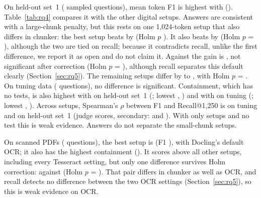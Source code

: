On held-out set~1 (\AQHeldOutQuestions{} sampled questions), mean token F1 is
highest with \RQfourBest{} (\RQfourBestFOne{}). Table~\ref{tab:rq4} compares
it with the other \RQfourComparisons{} digital setups. Answers are consistent with a large-chunk penalty, but this rests on one
1,024-token setup that also differs in chunker: the best setup beats
\RQfourDoclingFixedTokenSizeOneZeroTwoFourSetup{} by
\RQfourDoclingFixedTokenSizeOneZeroTwoFourDiff{}
\RQfourDoclingFixedTokenSizeOneZeroTwoFourCI{} (Holm $p$
\RQfourDoclingFixedTokenSizeOneZeroTwoFourHolm{}). It also beats
\RQfourDoclingMethodOneTreeTThreeEightFourSetup{} by
\RQfourDoclingMethodOneTreeTThreeEightFourDiff{}
\RQfourDoclingMethodOneTreeTThreeEightFourCI{} (Holm $p$ =
\RQfourDoclingMethodOneTreeTThreeEightFourHolm{}), although the two are tied on recall; because it contradicts recall, unlike the
first difference, we report it as open and do not claim it. Against
\RQfourDoclingLangchainDefaultSetup{} the gain is
\RQfourDoclingLangchainDefaultDiff{} \RQfourDoclingLangchainDefaultCI{}, not
significant after correction (Holm $p$ =
\RQfourDoclingLangchainDefaultHolm{}), although recall separates this default
clearly (Section~\ref{sec:rq5}). The remaining setups differ by
\RQfourDoclingLangchainRecursiveSizeFiveOneTwoDiff{} to
\RQfourDoclingLangchainRecursiveSizeTwoFiveSixDiff{}, with Holm $p$ =
\RQfourDoclingLangchainRecursiveSizeFiveOneTwoHolm{}. On tuning data (\AQTuningQuestions{} questions), no difference is
significant. Containment, which has no tests, is also highest with
\RQfourContainedHeldOutBest{} on held-out set~1
(\RQfourContainedHeldOutBestValue{}; lowest \RQfourContainedHeldOutLowest{},
\RQfourContainedHeldOutLowestValue{}) and with \RQfourContainedTuningBest{} on
tuning (\RQfourContainedTuningBestValue{}; lowest
\RQfourContainedTuningLowest{}, \RQfourContainedTuningLowestValue{}).
Across setups, Spearman's $\rho$ between F1 and
Recall@1,250 is \RQfourSpearmanTuningFOne{} on tuning and
\RQfourSpearmanHeldOutFOne{} on held-out set~1 (judge scores, secondary:
\RQfourSpearmanTuningJudge{} and \RQfourSpearmanHeldOutJudge{}). With only \RQfourSetups{} setups and no test this is weak evidence. Answers do
not separate the small-chunk setups.

On scanned PDFs (\AQScannedQuestions{} questions), the best setup is
\RQfourScannedBest{} (F1 \RQfourScannedBestFOne{}), with Docling's default OCR; it also has the highest containment
(\RQfourContainedScannedBestValue{}). It scores above all \RQfourScannedComparisons{} other setups, including every
Tesseract setting, but only one difference survives Holm correction:
\RQfourScannedTopDiff{} \RQfourScannedTopCI{} against
\RQfourScannedTopSetup{} (Holm $p$ = \RQfourScannedTopHolm{}). That pair differs
in chunker as well as OCR, and recall detects no difference between the two OCR
settings (Section~\ref{sec:rq5}), so this is weak evidence on OCR.

